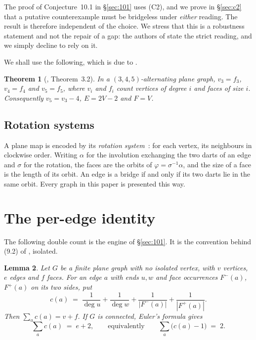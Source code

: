\documentclass{baustms}
\theoremstyle{cupthm}
\newtheorem{theorem}{Theorem}[section]
\newtheorem{lemma}[theorem]{Lemma}
\theoremstyle{cupdefn}
\theoremstyle{cuprem}
\begin{document}
The proof of Conjecture~10.1 in \S\ref{sec:101} uses (C2), and we prove in
\S\ref{sec:c2} that a putative counterexample must be bridgeless under
\emph{either} reading. The result is therefore independent of the choice. We
stress that this is a robustness statement and not the repair of a gap: the
authors of \cite{AHSSV2015} state the strict reading, and we simply decline to
rely on it.

We shall use the following, which is due to \cite{AHSSV2015}.

\begin{theorem}[\cite{AHSSV2015}, Theorem~3.2]\label{thm:32}
In a $(3,4,5)$-alternating plane graph, $v_3 = f_3$, $v_4 = f_4$ and
$v_5 = f_5$, where $v_i$ and $f_i$ count vertices of degree $i$ and faces of
size $i$. Consequently $v_5 = v_3 - 4$, $E = 2V - 2$ and $F = V$.
\end{theorem}

\subsection{Rotation systems}

A plane map is encoded by its \emph{rotation system}~\cite{MoharThomassen}: for each vertex, its
neighbours in clockwise order. Writing $\alpha$ for the involution exchanging
the two darts of an edge and $\sigma$ for the rotation, the faces are the orbits
of $\varphi = \sigma^{-1}\alpha$, and the size of a face is the length of its
orbit. An edge is a bridge if and only if its two darts lie in the same orbit.
Every graph in this paper is presented this way.

\section{The per-edge identity}\label{sec:identity}

The following double count is the engine of \S\ref{sec:101}. It is the
convention behind (9.2) of \cite{AHSSV2015}, isolated.

\begin{lemma}\label{lem:identity}
Let $G$ be a finite plane graph with no isolated vertex, with $v$ vertices,
$e$ edges and $f$ faces. For an edge
$a$ with ends $u,w$ and face occurrences $F^-(a)$, $F^+(a)$ on its two sides,
put
\[
  c(a) \;=\; \frac{1}{\deg u} + \frac{1}{\deg w}
           + \frac{1}{|F^-(a)|} + \frac{1}{|F^+(a)|}.
\]
Then $\sum_{a} c(a) = v + f$. If $G$ is connected, Euler's formula gives
\[
  \sum_{a} c(a) \;=\; e + 2 ,
  \qquad\text{equivalently}\qquad
  \sum_{a} \bigl(c(a) - 1\bigr) \;=\; 2 .
\]
\end{lemma}
\end{document}
